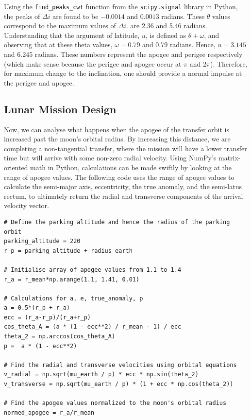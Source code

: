 \documentclass[12pt,twocolumn]{article}  %
\begin{document}
Using the \texttt{find\_peaks\_cwt} function from the \texttt{scipy.signal} 
library in Python, the peaks of $\Delta i$ are found to be $-0.0014$ and $0.0013$ radians. 
These $\theta$ values correspond to the maximum values of $\Delta i$.
 are 2.36 and 5.46 radians. Understanding that the argument of
latitude, $u$, is defined as $\theta + \omega$, and observing that at these theta values, $\omega = 0.79$ and
0.79 radians. Hence, $u = 3.145$ and $6.245$ radians. These numbers represent the apogee
and perigee respectively (which make sense
because the perigee and apogee occur at $\pi$
and 2$\pi$). Therefore, for maximum change to
the inclination, one should provide a normal
impulse at the perigee and apogee.

\subsection{Lunar Mission Design}

\indent Now, we can analyse what happens when
the apogee of the transfer orbit is increased
past the moon's orbital radius. By
increasing this distance, we are completing
a non-tangential transfer, where the mission
will have a lower transfer time but will arrive
with some non-zero radial velocity.
Using NumPy's matrix-oriented math in
Python, calculations can be made swiftly by looking at
the range of apogee values. 
\newline
\newline
\indent The following
code uses the range of apogee values to calculate the semi-major axis, eccentricity, the
true anomaly, and the semi-latus rectum, to
ultimately return the radial and transverse
components of the arrival velocity vector.

\begin{lstlisting}
# Define the parking altitude and hence the radius of the parking orbit
parking_altitude = 220
r_p = parking_altitude + radius_earth

# Initialise array of apogee values from 1.1 to 1.4
r_a = r_mean*np.arange(1.1, 1.41, 0.01)

# Calculations for a, e, true_anomaly, p
a = 0.5*(r_p + r_a)
ecc = (r_a-r_p)/(r_a+r_p)
cos_theta_A = (a * (1 - ecc**2) / r_mean - 1) / ecc
theta_2 = np.arccos(cos_theta_A)
p =  a * (1 - ecc**2)

# Find the radial and transverse velocities using orbital equations
v_radial = np.sqrt(mu_earth / p) * ecc * np.sin(theta_2)
v_transverse = np.sqrt(mu_earth / p) * (1 + ecc * np.cos(theta_2))

# Find the apogee values normalized to the moon's orbital radius
normed_apogee = r_a/r_mean 
\end{lstlisting}
\end{document}

